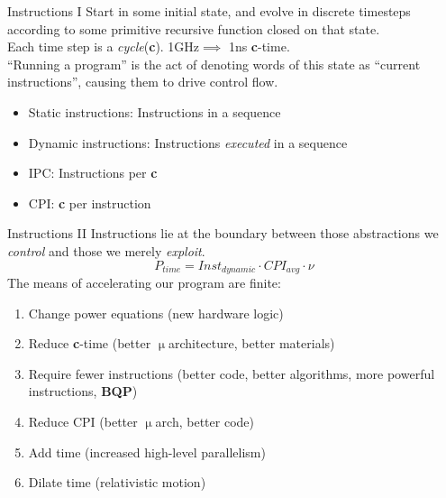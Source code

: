 \documentclass[mathserif,xcolor={dvipsnames,table}]{beamer}
\begin{document}
\begin{frame}{Instructions I}
Start in some initial state, and evolve in discrete timesteps
according to some primitive recursive function closed on that state.\\
\vspace{.25in}
Each time step is a \textit{cycle}(\textbf{c}). 1GHz$\implies$ 1ns \textbf{c}-time.\\
\vspace{.25in}
``Running a program'' is the act of denoting words of this state
as ``current instructions'', causing them to drive control flow.
\vspace{.25in}
\begin{itemize}
\item Static instructions: Instructions in a sequence
\item Dynamic instructions: Instructions \textit{executed} in a sequence
\item IPC: Instructions per \textbf{c}
\item CPI: \textbf{c} per instruction
\end{itemize}
\end{frame}

\begin{frame}{Instructions II}
Instructions lie at the boundary between those abstractions we \textit{control} and those
we merely \textit{exploit}.
\begin{equation}
P_{time} = Inst_{dynamic}\cdot CPI_{avg}\cdot\nu
\end{equation}
The means of accelerating our program are finite:
\begin{enumerate}
\item Change power equations (new hardware logic)
\item Reduce \textbf{c}-time (better $\upmu$architecture, better materials)
\item Require fewer instructions (better code, better algorithms, more powerful instructions, \textbf{BQP})
\item Reduce CPI (better $\upmu$arch, better code)
\item Add time (increased high-level parallelism)
\item Dilate time (relativistic motion)
\end{enumerate}
\end{frame}
\end{document}
